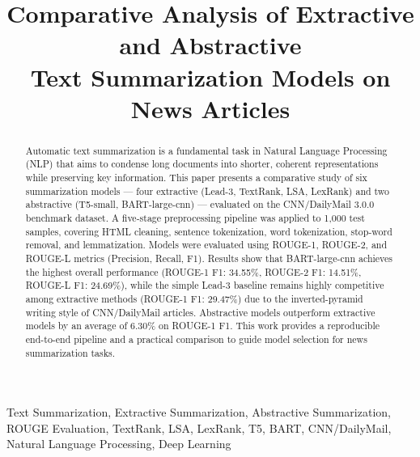 \documentclass[conference]{IEEEtran}
\begin{document}
\title{Comparative Analysis of Extractive and Abstractive\\
Text Summarization Models on News Articles}

\author{
    \and
}

\maketitle

\begin{abstract}
Automatic text summarization is a fundamental task in Natural Language
Processing (NLP) that aims to condense long documents into shorter,
coherent representations while preserving key information. This paper
presents a comparative study of six summarization models --- four
extractive (Lead-3, TextRank, LSA, LexRank) and two abstractive
(T5-small, BART-large-cnn) --- evaluated on the CNN/DailyMail 3.0.0
benchmark dataset. A five-stage preprocessing pipeline was applied to
1,000 test samples, covering HTML cleaning, sentence tokenization, word
tokenization, stop-word removal, and lemmatization. Models were evaluated
using ROUGE-1, ROUGE-2, and ROUGE-L metrics (Precision, Recall, F1).
Results show that BART-large-cnn achieves the highest overall performance
(ROUGE-1 F1: 34.55\%, ROUGE-2 F1: 14.51\%, ROUGE-L F1: 24.69\%), while
the simple Lead-3 baseline remains highly competitive among extractive
methods (ROUGE-1 F1: 29.47\%) due to the inverted-pyramid writing style
of CNN/DailyMail articles. Abstractive models outperform extractive
models by an average of 6.30\% on ROUGE-1 F1. This work provides a
reproducible end-to-end pipeline and a practical comparison to guide
model selection for news summarization tasks.
\end{abstract}

\begin{IEEEkeywords}
Text Summarization, Extractive Summarization, Abstractive Summarization,
ROUGE Evaluation, TextRank, LSA, LexRank, T5, BART, CNN/DailyMail,
Natural Language Processing, Deep Learning
\end{IEEEkeywords}
\end{document}
